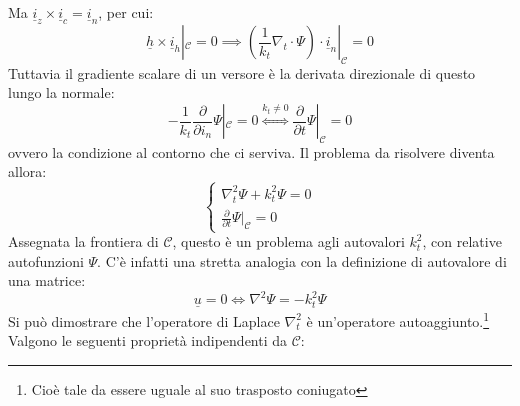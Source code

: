 \documentclass{book}
\begin{document}
    Ma $\underline{i}_{z} \times \underline{i}_{c} = \underline{i}_{n}$, per cui:
    \begin{equation}
        \underline{h}\times \underline{i}_{h}|_{\mathcal{C}} = 0 \implies (\frac{1}{k_{t}} \nabla_{t} \cdot \Psi)\cdot \underline{i}_{n}|_{\mathcal{C}} = 0
    \end{equation}
    Tuttavia il gradiente scalare di un versore è la derivata direzionale di questo lungo la normale:
    \begin{equation}
        -\frac{1}{k_{t}} \frac{\partial}{\partial i_{n}} \Psi|_{\mathcal{C}} = 0 \stackrel{k_{t} \neq 0}{\iff} \frac{\partial}{\partial t}\Psi|_{\mathcal{C}} = 0
    \end{equation}
    ovvero la condizione al contorno che ci serviva. Il problema da risolvere diventa allora:
    \begin{equation}
        \begin{cases}
            \nabla_{t} ^{2} \Psi+k_{t} ^{2}\Psi = 0 \\
            \displaystyle \frac{\partial}{\partial t}\Psi|_{\mathcal{C}} = 0
        \end{cases}
    \end{equation}
    Assegnata la frontiera di $\mathcal{C}$, questo è un problema agli autovalori $k_{t} ^{2}$, con relative autofunzioni $\Psi$.
    C'è infatti una stretta analogia con la definizione di autovalore di una matrice:
    \begin{equation}
        [\underline{\underline{A}}-a]\underline{u} = 0 \iff \nabla ^{2} \Psi = -k_{t} ^{2}\Psi
    \end{equation}
    Si può dimostrare che l'operatore di Laplace $\nabla_{t} ^{2}$ è un'operatore autoaggiunto.\footnote{Cioè tale da essere uguale al suo trasposto coniugato}
    Valgono le seguenti proprietà indipendenti da $\mathcal{C}$:
\end{document}
